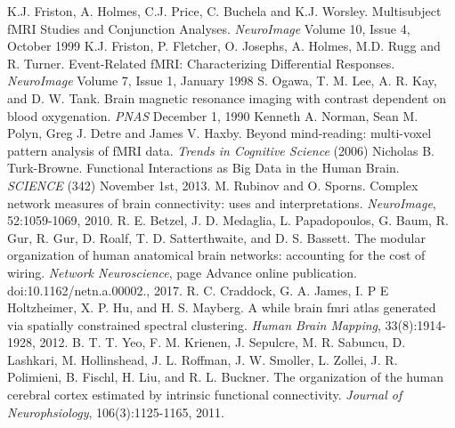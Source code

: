 \documentclass[12pt]{article}
\begin{document}
\begin{thebibliography}{1}
 K.J. Friston, A. Holmes, C.J. Price, C. Buchela and K.J. Worsley. Multisubject fMRI Studies and Conjunction Analyses. \textit{NeuroImage} Volume 10, Issue 4, October 1999
 K.J. Friston, P. Fletcher, O. Josephs, A. Holmes, M.D. Rugg and R. Turner. Event-Related fMRI: Characterizing Differential Responses. \textit{NeuroImage} Volume 7, Issue 1, January 1998
 S. Ogawa, T. M. Lee, A. R. Kay, and D. W. Tank. Brain magnetic resonance imaging with contrast dependent on blood oxygenation. \textit{PNAS} December 1, 1990
 Kenneth A. Norman, Sean M. Polyn, Greg J. Detre and James V. Haxby. Beyond mind-reading: multi-voxel pattern analysis of fMRI data. \textit{Trends in Cognitive Science} (2006)
 Nicholas B. Turk-Browne. Functional Interactions as Big Data in the Human Brain. \textit{SCIENCE} (342) November 1st, 2013.
 M. Rubinov and O. Sporns. Complex network measures of brain connectivity: uses and interpretations. \textit{NeuroImage}, 52:1059-1069, 2010.
 R. E. Betzel, J. D. Medaglia, L. Papadopoulos, G. Baum, R. Gur, R. Gur, D. Roalf, T. D. Satterthwaite, and D. S. Bassett. The modular organization of human anatomical brain networks: accounting for the cost of wiring. \textit{Network Neuroscience}, page Advance online publication. doi:10.1162/netn.a.00002., 2017.
 R. C. Craddock, G. A. James, I. P E Holtzheimer, X. P. Hu, and H. S. Mayberg. A while brain fmri atlas generated via spatially constrained spectral clustering. \textit{Human Brain Mapping}, 33(8):1914-1928, 2012.
 B. T. T. Yeo, F. M. Krienen, J. Sepulcre, M. R. Sabuncu, D. Lashkari, M. Hollinshead, J. L. Roffman, J. W. Smoller, L. Zollei, J. R. Polimieni, B. Fischl, H. Liu, and R. L. Buckner. The organization of the human cerebral cortex estimated by intrinsic functional connectivity. \textit{Journal of Neurophsiology}, 106(3):1125-1165, 2011.
\end{thebibliography}
\end{document}
